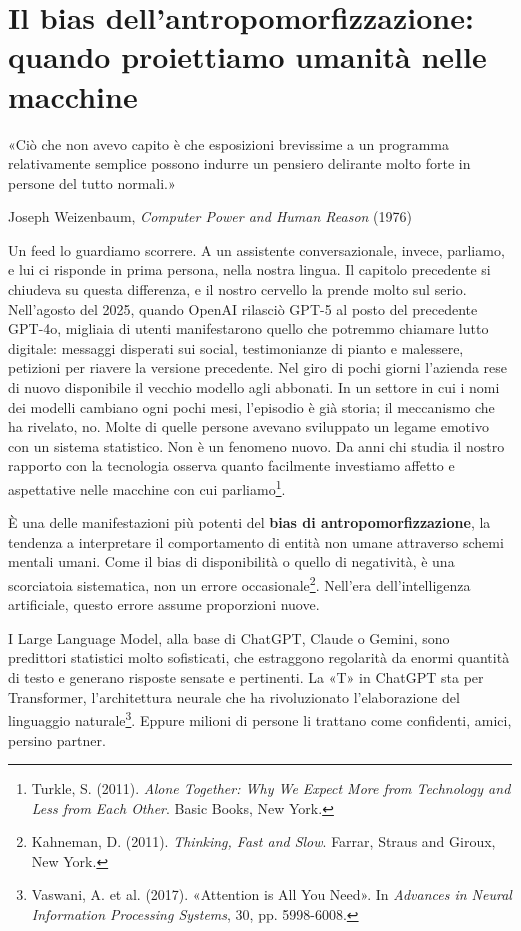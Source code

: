 \chapter{Il bias dell'antropomorfizzazione: quando proiettiamo umanità nelle macchine}
\label{chap:ai-antropomorfo}
\label{cap:p3c35}
\epigraph{«Ciò che non avevo capito è che esposizioni brevissime a un programma relativamente semplice possono indurre un pensiero delirante molto forte in persone del tutto normali.»}{Joseph Weizenbaum, \textit{Computer Power and Human Reason} (1976)}

Un feed lo guardiamo scorrere. A un assistente conversazionale, invece, parliamo, e lui ci risponde in prima persona, nella nostra lingua. Il capitolo precedente si chiudeva su questa differenza, e il nostro cervello la prende molto sul serio. Nell'agosto del 2025, quando OpenAI rilasciò GPT-5 al posto del precedente GPT-4o, migliaia di utenti manifestarono quello che potremmo chiamare lutto digitale: messaggi disperati sui social, testimonianze di pianto e malessere, petizioni per riavere la versione precedente. Nel giro di pochi giorni l'azienda rese di nuovo disponibile il vecchio modello agli abbonati. In un settore in cui i nomi dei modelli cambiano ogni pochi mesi, l'episodio è già storia; il meccanismo che ha rivelato, no. Molte di quelle persone avevano sviluppato un legame emotivo con un sistema statistico. Non è un fenomeno nuovo. Da anni chi studia il nostro rapporto con la tecnologia osserva quanto facilmente investiamo affetto e aspettative nelle macchine con cui parliamo\footnote{Turkle, S. (2011). \textit{Alone Together: Why We Expect More from Technology and Less from Each Other}. Basic Books, New York.}.

È una delle manifestazioni più potenti del \textbf{bias di antropomorfizzazione}, la tendenza a interpretare il comportamento di entità non umane attraverso schemi mentali umani. Come il bias di disponibilità o quello di negatività, è una scorciatoia sistematica, non un errore occasionale\footnote{Kahneman, D. (2011). \textit{Thinking, Fast and Slow}. Farrar, Straus and Giroux, New York.}. Nell'era dell'intelligenza artificiale, questo errore assume proporzioni nuove.

I Large Language Model, alla base di ChatGPT, Claude o Gemini, sono predittori statistici molto sofisticati, che estraggono regolarità da enormi quantità di testo e generano risposte sensate e pertinenti. La «T» in ChatGPT sta per Transformer, l'architettura neurale che ha rivoluzionato l'elaborazione del linguaggio naturale\footnote{Vaswani, A. et al. (2017). «Attention is All You Need». In \textit{Advances in Neural Information Processing Systems}, 30, pp. 5998-6008.}. Eppure milioni di persone li trattano come confidenti, amici, persino partner.

